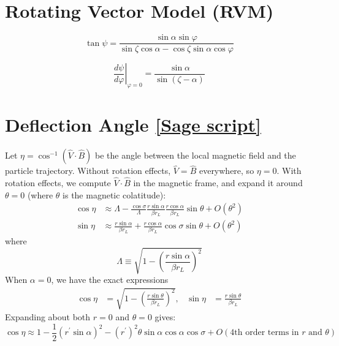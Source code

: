 \documentclass{book}
\newcommand{\phase}{\varphi}
\newcommand{\linktosage}[1]{\hyperref[#1]{[Sage script]}}
\begin{document}
\section{Rotating Vector Model (RVM)}

\begin{equation}
    \tan{\psi} = \frac{\sin\alpha \sin\phase}{\sin\zeta\cos\alpha - \cos\zeta\sin\alpha\cos\phase}
\end{equation}

\begin{equation}
    \left.\frac{d\psi}{d\phase}\right|_{\phase=0} = \frac{\sin\alpha}{\sin(\zeta-\alpha)}
\end{equation}

\section{Deflection Angle \linktosage{sage:aberration_dip}}

Let $\eta = \cos^{-1}(\hat{V}\cdot\hat{B})$ be the angle between the local magnetic field and the particle trajectory.
Without rotation effects, $\hat{V} = \hat{B}$ everywhere, so $\eta = 0$.
With rotation effects, we compute $\hat{V}\cdot\hat{B}$ in the magnetic frame, and expand it around $\theta = 0$ (where $\theta$ is the magnetic colatitude):
\begin{equation}
    \begin{aligned}
        \cos\eta &\approx \Lambda - \frac{\cos\sigma}{\Lambda} \frac{r\sin\alpha}{\beta r_L} \frac{r\cos\alpha}{\beta r_L} \sin\theta +
                          O(\theta^2) \\
        \sin\eta &\approx \frac{r\sin\alpha}{\beta r_L} + \frac{r\cos\alpha}{\beta r_L}\cos\sigma\sin\theta +
                          O(\theta^2)
    \end{aligned}
\end{equation}
where
\begin{equation}
    \Lambda \equiv \sqrt{1-\left(\frac{r\sin\alpha}{\beta r_L}\right)^2}
\end{equation}
When $\alpha = 0$, we have the exact expressions
\begin{align}
    \cos\eta &= \sqrt{1-\left(\frac{r\sin\theta}{\beta r_L}\right)^2}, &
    \sin\eta &= \frac{r\sin\theta}{\beta r_L}
\end{align}
Expanding about both $r = 0$ and $\theta = 0$ gives:
\begin{equation}
    \cos\eta \approx 1 - \frac12(r^\prime\sin\alpha)^2 - (r^\prime)^2\theta\sin\alpha\cos\alpha\cos\sigma + O(\text{4th order terms in $r$ and $\theta$})
\end{equation}
\end{document}
